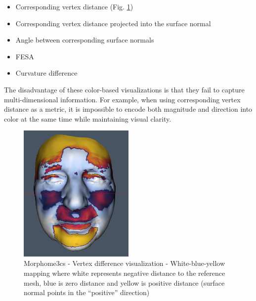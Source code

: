 
\begin{itemize}
\item Corresponding vertex distance (Fig. \ref{fig:morpho_example})
\item Corresponding vertex distance projected into the surface normal
\item Angle between corresponding surface normals
\item FESA\footnotemark
\item Curvature difference
\end{itemize}


The disadvantage of these color-based visualizations is that they fail to capture multi-dimensional information. For example, when using corresponding vertex distance as a metric, it is impossible to encode both magnitude and direction into color at the same time while maintaining visual clarity.

\begin{figure}[h]
\centering
\includegraphics[width=0.5\textwidth]{./img/morpho-example01.PNG}
\caption{Morphome3cs - Vertex difference visualization - White-blue-yellow mapping where white represents negative distance to the reference mesh, blue is zero distance and yellow is positive distance (surface normal points in the ``positive'' direction)}
\label{fig:morpho_example}
\end{figure}

